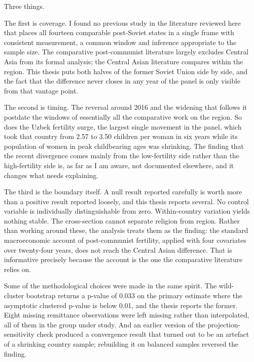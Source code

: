 Three things.

The first is coverage. I found no previous study in the literature reviewed here that places all fourteen comparable post-Soviet states in a single frame with consistent measurement, a common window and inference appropriate to the sample size. The comparative post-communist literature largely excludes Central Asia from its formal analysis; the Central Asian literature compares within the region. This thesis puts both halves of the former Soviet Union side by side, and the fact that the difference never closes in any year of the panel is only visible from that vantage point.

The second is timing. The reversal around 2016 and the widening that follows it postdate the windows of essentially all the comparative work on the region. So does the Uzbek fertility surge, the largest single movement in the panel, which took that country from 2.57 to 3.50 children per woman in six years while its population of women in peak childbearing ages was shrinking. The finding that the recent divergence comes mainly from the low-fertility side rather than the high-fertility side is, as far as I am aware, not documented elsewhere, and it changes what needs explaining.

The third is the boundary itself. A null result reported carefully is worth more than a positive result reported loosely, and this thesis reports several. No control variable is individually distinguishable from zero. Within-country variation yields nothing stable. The cross-section cannot separate religion from region. Rather than working around these, the analysis treats them as the finding: the standard macroeconomic account of post-communist fertility, applied with four covariates over twenty-four years, does not reach the Central Asian difference. That is informative precisely because the account is the one the comparative literature relies on.

Some of the methodological choices were made in the same spirit. The wild-cluster bootstrap returns a p-value of 0.033 on the primary estimate where the asymptotic clustered p-value is below 0.01, and the thesis reports the former. Eight missing remittance observations were left missing rather than interpolated, all of them in the group under study. And an earlier version of the projection-sensitivity check produced a convergence result that turned out to be an artefact of a shrinking country sample; rebuilding it on balanced samples reversed the finding.

